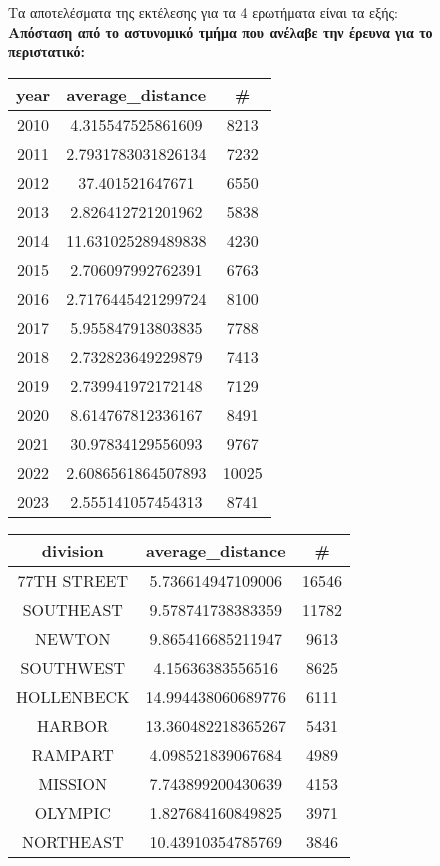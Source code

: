 \documentclass{article}
\begin{document}
Τα αποτελέσματα της εκτέλεσης για τα 4 ερωτήματα είναι τα εξής: \\

\noindent\textbf{Απόσταση από το αστυνομικό τμήμα που ανέλαβε την έρευνα για το περιστατικό:}

\begin{center}
\begin{tabular}{|c|c|c|}
\hline
\textbf{year} & \textbf{average\_distance} & \textbf{\#} \\
\hline
2010 & 4.315547525861609 & 8213 \\
2011 & 2.7931783031826134 & 7232 \\
2012 & 37.401521647671 & 6550 \\
2013 & 2.826412721201962 & 5838 \\
2014 & 11.631025289489838 & 4230 \\
2015 & 2.706097992762391 & 6763 \\
2016 & 2.7176445421299724 & 8100 \\
2017 & 5.955847913803835 & 7788 \\
2018 & 2.732823649229879 & 7413 \\
2019 & 2.739941972172148 & 7129 \\
2020 & 8.614767812336167 & 8491 \\
2021 & 30.97834129556093 & 9767 \\
2022 & 2.6086561864507893 & 10025 \\
2023 & 2.555141057454313 & 8741 \\
\hline
\end{tabular}
\quad
\begin{tabular}{|c|c|c|}
\hline
\textbf{division} & \textbf{average\_distance} & \textbf{\#} \\
\hline
77TH STREET & 5.736614947109006 & 16546 \\
SOUTHEAST & 9.578741738383359 & 11782 \\
NEWTON & 9.865416685211947 & 9613 \\
SOUTHWEST & 4.15636383556516 & 8625 \\
HOLLENBECK & 14.994438060689776 & 6111 \\
HARBOR & 13.360482218365267 & 5431 \\
RAMPART & 4.098521839067684 & 4989 \\
MISSION & 7.743899200430639 & 4153 \\
OLYMPIC & 1.827684160849825 & 3971 \\
NORTHEAST & 10.43910354785769 & 3846 \\

\end{tabular}
\end{center}
\end{document}
